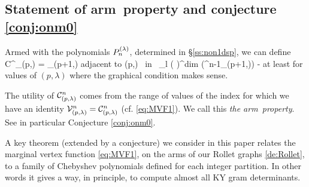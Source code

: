 \newcommand{\ournotmain}{arm}

\subsection{Statement of \ournotmain\ property and conjecture \ref{conj:onm0}}
\label{ss:e-next!}


\newcommand{\CC}{{\mathcal C}}  %

\mdef   \label{de:arm-property}
Armed with the polynomials $P_n^{(\lambda)}$, determined in \S\ref{ss:non1dsp}, 
we can define 
\beq  \label{eq:defCC} 
\CC^{}_{(p,\lambda)} 
= \prod_{{(p+1,\mu )\; adjacent \; \atop to \; (p,\lambda) \ in \ \Roll_l}} 
     \left(  \right)^{dim (\Deltaa^{n-1}_{(p+1,\mu )}) } 
\eq 
- at least for values of $(p,\lambda)$ where the graphical condition makes sense. 

The utility of $\CC^n_{(p,\l)}$ comes from the range of values of the index for which we have 
an identity $\V^n_{(p,\lambda)} = \CC^n_{(p,\lambda)}$ (cf. \ref{eq:MVF1}). 
We call this {\em the \ournotmain\ property}. 
See in particular Conjecture \ref{conj:onm0}. 

\medskip 

A key theorem (extended by a conjecture) we consider in this paper relates the marginal vertex function 
\eqref{eq:MVF1}, 
on the arms of our Rollet graphs 
\ref{de:Rollet}, 
to a family of Chebyshev polynomials defined for each integer partition. 
In other words it gives a way, in principle, to compute almost all KY gram determinants. 


